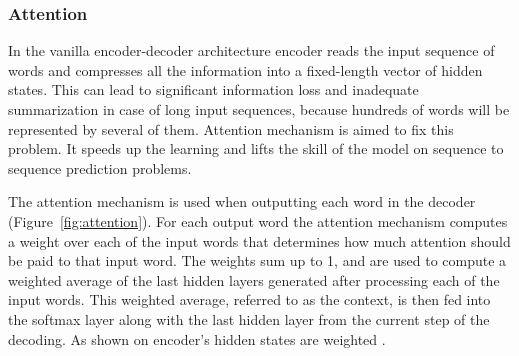 %	


\subsubsection{Attention} \label{attention}
In the vanilla encoder-decoder architecture encoder reads the input sequence of words and compresses all the information into a fixed-length vector of hidden states. This can lead to significant information loss and inadequate summarization in case of long input sequences, because hundreds of words will be represented by several of them. Attention mechanism is aimed to fix this problem. It speeds up the learning and lifts the skill of the model on sequence to sequence prediction problems. 

The attention mechanism is used when outputting each word in the decoder (Figure~\ref{fig:attention}). For each output word the attention mechanism computes a weight over each of the input words that determines how much attention should be paid to that input word. The weights sum up to 1, and are used to compute a weighted average of the last hidden layers generated after processing
each of the input words. This weighted average, referred to as the context, is then fed into the softmax layer along with the last hidden layer from the current step of the decoding. As shown on  encoder's hidden states are weighted  \cite{model-baseline-article}.  

